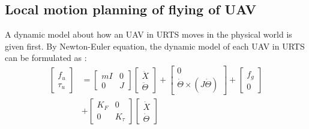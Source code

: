 \documentclass{ieeeaccess}
\begin{document}
\subsection{Local motion planning of flying of UAV}
A dynamic model about how an UAV in URTS moves in the physical world is given first. By Newton-Euler equation, the dynamic model of each UAV in URTS can be formulated as \cite{sabatino2015quadrotor}:
\begin{equation} \label{eq:uav} 
    \begin{split}
        \begin{bmatrix}
            f_u \\ \tau_u
        \end{bmatrix}&=\begin{bmatrix}
            mI & 0 \\ 0 & J
        \end{bmatrix}\begin{bmatrix}
            \ddot{X} \\ \ddot{\Theta}
        \end{bmatrix}+\begin{bmatrix}
            0 \\ \dot{\Theta}\times(J\dot{\Theta})
        \end{bmatrix}+\begin{bmatrix}
            f_g \\ 0
        \end{bmatrix}
        \\
        &+\begin{bmatrix}
            K_F & 0 \\
            0 & K_\tau
        \end{bmatrix}\begin{bmatrix}
            \dot{X} \\ \dot{\Theta}
        \end{bmatrix}
    \end{split}
\end{equation}
\end{document}
